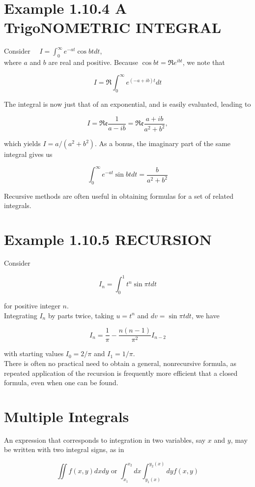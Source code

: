 \documentclass[10pt]{article}
\begin{document}
\section*{Example 1.10.4 A TrigoNOMETRIC INTEGRAL}
Consider $\quad I=\int_{0}^{\infty} e^{-a t} \cos b t d t$,\\
where $a$ and $b$ are real and positive. Because $\cos b t=\mathfrak{R} e^{i b t}$, we note that

$$
I=\mathfrak{R} \int_{0}^{\infty} e^{(-a+i b) t} d t
$$

The integral is now just that of an exponential, and is easily evaluated, leading to

$$
I=\mathfrak{R e} \frac{1}{a-i b}=\mathfrak{R e} \frac{a+i b}{a^{2}+b^{2}},
$$

which yields $I=a /\left(a^{2}+b^{2}\right)$. As a bonus, the imaginary part of the same integral gives us

$$
\int_{0}^{\infty} e^{-a t} \sin b t d t=\frac{b}{a^{2}+b^{2}}
$$

Recursive methods are often useful in obtaining formulas for a set of related integrals.

\section*{Example 1.10.5 RECURSION}
Consider

$$
I_{n}=\int_{0}^{1} t^{n} \sin \pi t d t
$$

for positive integer $n$.\\
Integrating $I_{n}$ by parts twice, taking $u=t^{n}$ and $d v=\sin \pi t d t$, we have

$$
I_{n}=\frac{1}{\pi}-\frac{n(n-1)}{\pi^{2}} I_{n-2}
$$

with starting values $I_{0}=2 / \pi$ and $I_{1}=1 / \pi$.\\
There is often no practical need to obtain a general, nonrecursive formula, as repeated application of the recursion is frequently more efficient that a closed formula, even when one can be found.

\section*{Multiple Integrals}
An expression that corresponds to integration in two variables, say $x$ and $y$, may be written with two integral signs, as in

$$
\iint f(x, y) d x d y \text { or } \int_{x_{1}}^{x_{2}} d x \int_{y_{1}(x)}^{y_{2}(x)} d y f(x, y)
$$
\end{document}
